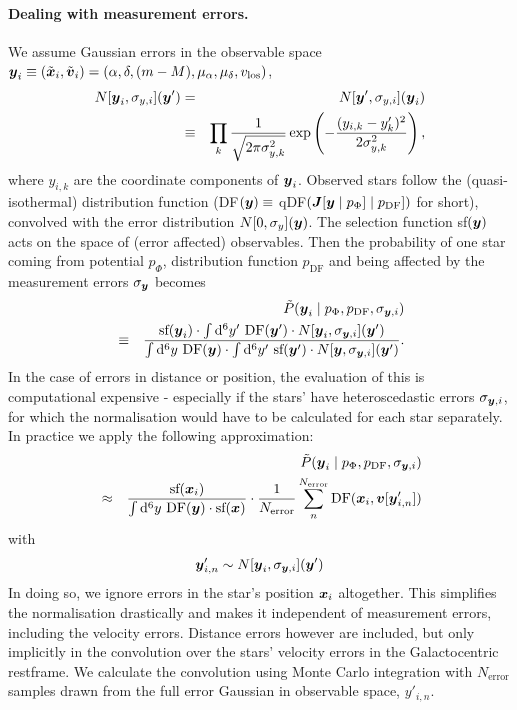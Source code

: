 
\paragraph{Dealing with measurement errors.} 

We assume Gaussian errors in the observable space $\boldsymbol{y}_i \equiv (\tilde{\boldsymbol{x}}_i,\tilde{\boldsymbol{v}}_i)=(\alpha,\delta,(m-M),\mu_\alpha,\mu_\delta,v_\text{los})$,
\begin{eqnarray*}
N[\boldsymbol{y}_i,\sigma_{y,i}](\boldsymbol{y}') &=& N[\boldsymbol{y}',\sigma_{y,i}](\boldsymbol{y}_i)\\ &\equiv&  \prod_k \frac{1}{\sqrt{2\pi\sigma_{y,k}^2}} \exp\left( -\frac{(y_{i,k}-y_k')^2}{2\sigma_{y,k}^2}\right),
\end{eqnarray*}
where $y_{i,k}$ are the coordinate components of $\boldsymbol{y}_i$. Observed stars follow the (quasi-isothermal) distribution function (DF$(\boldsymbol{y}) \equiv$ qDF$(\boldsymbol{J}[\boldsymbol{y} \mid p_\Phi] \mid p_\text{DF}])$ for short), convolved with the error distribution $N[0,\sigma_{y}](\boldsymbol{y})$. The selection function sf$(\boldsymbol{y})$ acts on the space of (error affected) observables. 
Then the probability of one star coming from potential $p_\Phi$, distribution function $p_\text{DF}$ and being affected by the measurement errors $\sigma_{\boldsymbol{y}}$ becomes
\begin{eqnarray*}
&&\tilde{P}(\boldsymbol{y}_i \mid p_\Phi,p_\text{DF},\sigma_{\boldsymbol{y},i})\\
& \equiv& \frac{\text{sf}(\boldsymbol{y}_i) \cdot \int \mathop{}\!\mathrm{d^6} y' \  \text{DF}(\boldsymbol{y}') \cdot N[\boldsymbol{y}_i,\sigma_{\boldsymbol{y},i}](\boldsymbol{y}')}{\int \mathop{}\!\mathrm{d^6}y  \  \text{DF}(\boldsymbol{y})  \cdot  \int \mathop{}\!\mathrm{d^6} y' \  \text{sf}(\boldsymbol{y}')  \cdot N[\boldsymbol{y},\sigma_{\boldsymbol{y},i}](\boldsymbol{y}')}.
\end{eqnarray*}
In the case of errors in distance or position, the evaluation of this is computational expensive - especially if the stars' have heteroscedastic errors $\sigma_{\boldsymbol{y},i}$, for which the normalisation would have to be calculated for each star separately. In practice we apply the following approximation:
\begin{eqnarray}
&&\tilde{P}(\boldsymbol{y}_i \mid p_\Phi,p_\text{DF},\sigma_{\boldsymbol{y},i}) \nonumber\\
&\approx& \frac{ \text{sf}(\boldsymbol{x}_i)}{\int \mathop{}\!\mathrm{d^6}y  \  \text{DF}(\boldsymbol{y})  \cdot   \text{sf}(\boldsymbol{x})} \cdot \frac{1}{N_\text{error}} \sum_n^{N_\text{error}}  \text{DF}(\boldsymbol{x}_i,\boldsymbol{v}[\boldsymbol{y}'_{i,n}])\nonumber
\end{eqnarray}
with
\begin{eqnarray}
\boldsymbol{y}'_{i,n} \sim N[\boldsymbol{y}_i,\sigma_{\boldsymbol{y},i}](\boldsymbol{y}')\nonumber
\end{eqnarray}
In doing so, we ignore errors in the star's position $\boldsymbol{x}_i$ altogether. This simplifies the normalisation drastically and makes it independent of measurement errors, including the velocity errors. Distance errors however are included, but only implicitly in the convolution over the stars' velocity errors in the Galactocentric restframe. We calculate the convolution using Monte Carlo integration with $N_\text{error}$ samples drawn from the full error Gaussian in observable space, $y'_{i,n}$. 
